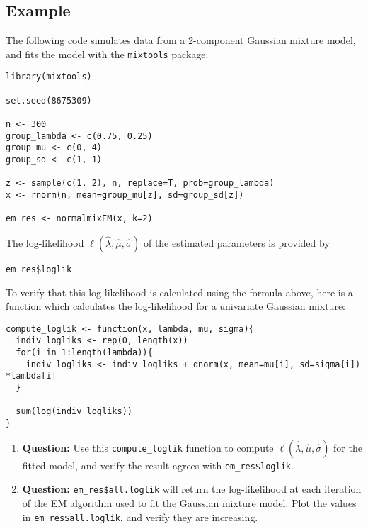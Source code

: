 \documentclass[12pt]{article}
\begin{document}
\subsection*{Example}

The following code simulates data from a 2-component Gaussian mixture model, and fits the model with the \verb;mixtools; package:

\begin{verbatim}
library(mixtools)

set.seed(8675309)

n <- 300
group_lambda <- c(0.75, 0.25)
group_mu <- c(0, 4)
group_sd <- c(1, 1)

z <- sample(c(1, 2), n, replace=T, prob=group_lambda)
x <- rnorm(n, mean=group_mu[z], sd=group_sd[z])

em_res <- normalmixEM(x, k=2)
\end{verbatim}

The log-likelihood $\ell(\widehat{\lambda}, \widehat{\mu}, \widehat{\sigma})$ of the estimated parameters is provided by

\begin{verbatim}
em_res$loglik
\end{verbatim}

To verify that this log-likelihood is calculated using the formula above, here is a function which calculates the log-likelihood for a univariate Gaussian mixture:

\begin{verbatim}
compute_loglik <- function(x, lambda, mu, sigma){
  indiv_logliks <- rep(0, length(x))
  for(i in 1:length(lambda)){
    indiv_logliks <- indiv_logliks + dnorm(x, mean=mu[i], sd=sigma[i]) *lambda[i]
  }
  
  sum(log(indiv_logliks))
}
\end{verbatim}

\begin{enumerate}
\item \textbf{Question:} Use this \verb;compute_loglik; function to compute $\ell(\widehat{\lambda}, \widehat{\mu}, \widehat{\sigma})$ for the fitted model, and verify the result agrees with \verb;em_res$loglik;.

\vspace{2.5cm}

\item \textbf{Question:} \verb;em_res$all.loglik; will return the log-likelihood at each iteration of the EM algorithm used to fit the Gaussian mixture model. Plot the values in \verb;em_res$all.loglik;, and verify they are increasing.
\end{enumerate}
\end{document}
